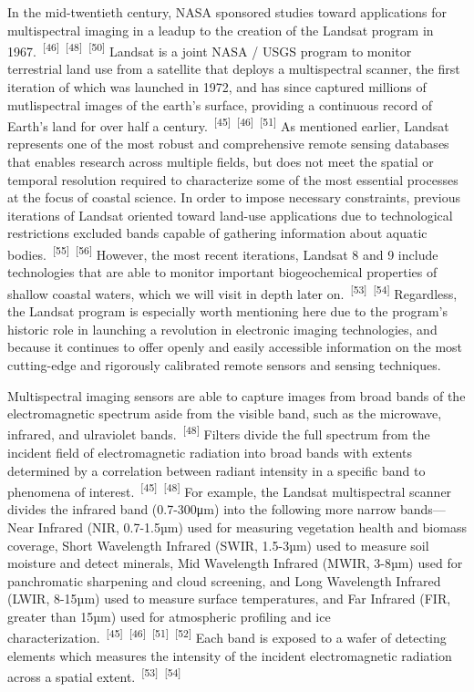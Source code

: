 \documentclass{article}
\begin{document}
\par{In the mid-twentieth century, NASA sponsored studies toward applications for multispectral imaging in a leadup to the creation of the Landsat program in 1967.~\textsuperscript{[46]}~\textsuperscript{[48]}~\textsuperscript{[50]} Landsat is a joint NASA / USGS program to monitor terrestrial land use from a satellite that deploys a multispectral scanner, the first iteration of which was launched in 1972, and has since captured millions of mutlispectral images of the earth's surface, providing a continuous record of Earth's land for over half a century.~\textsuperscript{[45]}~\textsuperscript{[46]}~\textsuperscript{[51]} As mentioned earlier, Landsat represents one of the most robust and comprehensive remote sensing databases that enables research across multiple fields, but does not meet the spatial or temporal resolution required to characterize some of the most essential processes at the focus of coastal science. In order to impose necessary constraints, previous iterations of Landsat oriented toward land-use applications due to technological restrictions excluded bands capable of gathering information about aquatic bodies.~\textsuperscript{[55]}~\textsuperscript{[56]} However, the most recent iterations, Landsat 8 and 9 include technologies that are able to monitor important biogeochemical properties of shallow coastal waters, which we will visit in depth later on.~\textsuperscript{[53]}~\textsuperscript{[54]} Regardless, the Landsat program is especially worth mentioning here due to the program's historic role in launching a revolution in electronic imaging technologies, and because it continues to offer openly and easily accessible information on the most cutting-edge and rigorously calibrated remote sensors and sensing techniques.}

\par{Multispectral imaging sensors are able to capture images from broad bands of the electromagnetic spectrum aside from the visible band, such as the microwave, infrared, and ulraviolet bands.~\textsuperscript{[48]} Filters divide the full spectrum from the incident field of electromagnetic radiation into broad bands with extents determined by a correlation between radiant intensity in a specific band to phenomena of interest.~\textsuperscript{[45]}~\textsuperscript{[48]} For example, the Landsat multispectral scanner divides the infrared band (0.7-300μm) into the following more narrow bands---Near Infrared (NIR, 0.7-1.5µm) used for measuring vegetation health and biomass coverage, Short Wavelength Infrared (SWIR, 1.5-3µm) used to measure soil moisture and detect minerals, Mid Wavelength Infrared (MWIR, 3-8µm) used for panchromatic sharpening and cloud screening, and Long Wavelength Infrared (LWIR, 8-15µm) used to measure surface temperatures, and Far Infrared (FIR, greater than 15µm) used for atmospheric profiling and ice characterization.~\textsuperscript{[45]}~\textsuperscript{[46]}~\textsuperscript{[51]}~\textsuperscript{[52]} Each band is exposed to a wafer of detecting elements which measures the intensity of the incident electromagnetic radiation across a spatial extent.~\textsuperscript{[53]}~\textsuperscript{[54]} }
\end{document}
